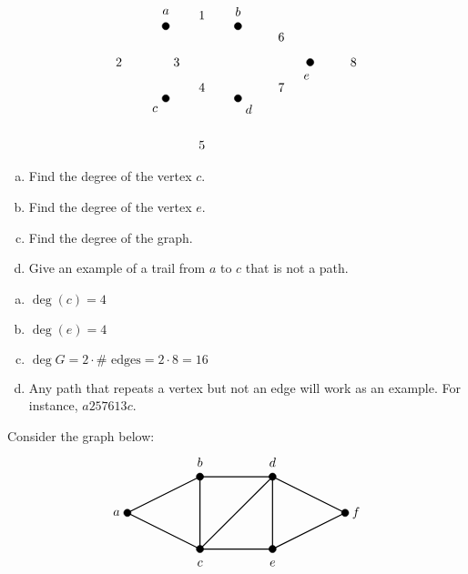 \documentclass[12pt,letterpaper]{exam}
\begin{document}
\begin{questions}
\[\begin{tikzpicture}
	\draw[fill=black] (0,0) circle (0.1);
	\draw[fill=black] (0,2) circle (0.1);
	\draw[fill=black] (2,2) circle (0.1);
	\draw[fill=black] (2,0) circle (0.1);
	\draw[fill=black] (4,1) circle (0.1);
	
	\node at (1,2.3) {$1$};
	\node at (-1.3,1) {$2$};
	\node at (0.3,1) {$3$};
	\node at (1,0.3) {$4$};
	\node at (1,-1.3) {$5$};
	\node at (3.2,1.7) {$6$};
	\node at (3.2,0.3) {$7$};
	\node at (5.2,1) {$8$};
	
	\node at (0,2.4) {$a$};
	\node at (2,2.4) {$b$};
	\node at (-0.3,-0.3) {$c$};
	\node at (2.3,-0.3) {$d$};
	\node at (3.9,0.6) {$e$};
	\end{tikzpicture}
	\]

\begin{enumerate}[(a)]
\item Find the degree of the vertex $c$.
\item Find the degree of the vertex $e$. 
\item Find the degree of the graph. 
\item Give an example of a trail from $a$ to $c$ that is not a path. 
\end{enumerate} \pspace

\sol 
\begin{enumerate}[(a)]
\item $\deg(c)= 4$ \pspace

\item $\deg(e)= 4$ \pspace

\item $\deg G= 2 \cdot \# \text{ edges}= 2 \cdot 8=16$ \pspace

\item Any path that repeats a vertex but not an edge will work as an example. For instance, $a257613c$.
\end{enumerate}



\newpage
\question[10]  Consider the graph below:
	\[
	\begin{tikzpicture}
	\draw[line width=0.03cm] (0,2) -- (-2,1) -- (0,0);
	\draw[line width=0.03cm] (2,2) -- (0,2) -- (0,0) -- (2,0) -- (4,1) -- (2,2) -- (2,0);
	\draw[line width=0.03cm] (0,0) -- (2,2);
	
	\draw[fill=black] (-2,1) circle (0.1);
	\draw[fill=black] (0,0) circle (0.1);
	\draw[fill=black] (0,2) circle (0.1);
	\draw[fill=black] (2,0) circle (0.1);
	\draw[fill=black] (2,2) circle (0.1);
	\draw[fill=black] (4,1) circle (0.1);
	
	\node at (-2.3,1) {$a$};
	\node at (0,2.4) {$b$};
	\node at (0,-0.4) {$c$};
	\node at (2,2.4) {$d$};
	\node at (2,-0.4) {$e$};
	\node at (4.3,1) {$f$};
	

\end{tikzpicture}\]
\end{questions}
\end{document}
